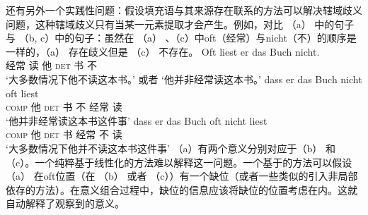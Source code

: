 还有另外一个实践性问题：假设填充语与其来源存在联系的方法可以解决辖域歧义问题，这种辖域歧义只有当某一元素提取才会产生。例如，对比 （a） 中的句子与 （b, c）中的句子：虽然在 （a） 、（c）中oft（经常）与nicht（不）的顺序是一样的，（a） 存在歧义但是 （c） 不存在。
\eal
\ex 
\gll Oft liest er das Buch nicht.\\
     经常 读 他 \textsc{det} 书 不\\
\glt `大多数情况下他不读这本书。' 或者 `他并非经常读这本书。'
\ex
\gll dass er das Buch nicht oft liest\\
     \textsc{comp} 他 \textsc{det} 书 不 经常 读\\
\glt `他并非经常读这本书这件事'
\ex
\gll dass er das Buch oft nicht liest\\
     \textsc{comp} 他 \textsc{det} 书 经常 不 读\\
\glt `大多数情况下他并不读这本书这件事'
\zl
（a）有两个意义分别对应于（b） 和 （c）。一个纯粹基于线性化的方法难以解释这一问题。一个基于\slaschc 的方法可以假设 （a） 在oft位置（在 （b） 或者 （c））有一个缺位（或者一些类似的引入非局部依存的方法）。在意义组合过程中，缺位的信息应该将缺位的位置考虑在内。这就自动解释了观察到的意义。

